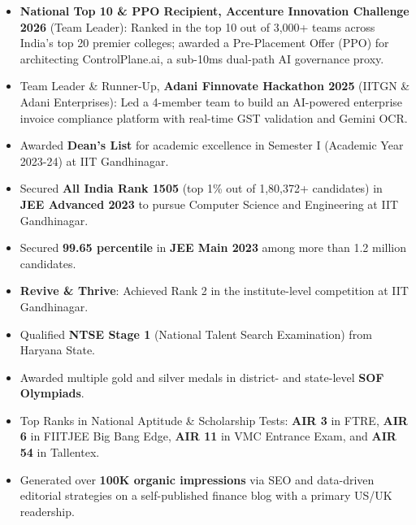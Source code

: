\documentclass[a4paper,10pt]{article}
\newcommand{\isep}{-2 pt}
\begin{document}
\begin{itemize} \itemsep \isep

    \item \textbf{National Top 10 \& PPO Recipient, Accenture Innovation Challenge 2026} (Team Leader): Ranked in the top 10 out of 3,000+ teams across India's top 20 premier colleges; awarded a Pre-Placement Offer (PPO) for architecting ControlPlane.ai, a sub-10ms dual-path AI governance proxy.

    \item Team Leader \& Runner-Up, \textbf{Adani Finnovate Hackathon 2025} (IITGN \& Adani Enterprises): Led a 4-member team to build an AI-powered enterprise invoice compliance platform with real-time GST validation and Gemini OCR.

    \item Awarded \textbf{Dean's List} for academic excellence in Semester I (Academic Year 2023-24) at IIT Gandhinagar.

    \item Secured \textbf{All India Rank 1505} (top 1\% out of 1,80,372+ candidates) in \textbf{JEE Advanced 2023} to pursue Computer Science and Engineering at IIT Gandhinagar.

    \item Secured \textbf{99.65 percentile} in \textbf{JEE Main 2023} among more than 1.2 million candidates.

    \item \textbf{Revive \& Thrive}: Achieved Rank 2 in the institute-level competition at IIT Gandhinagar.

    \item Qualified \textbf{NTSE Stage 1} (National Talent Search Examination) from Haryana State.

    \item Awarded multiple gold and silver medals in district- and state-level \textbf{SOF Olympiads}.

    \item Top Ranks in National Aptitude \& Scholarship Tests: \textbf{AIR 3} in FTRE, \textbf{AIR 6} in FIITJEE Big Bang Edge, \textbf{AIR 11} in VMC Entrance Exam, and \textbf{AIR 54} in Tallentex.

    \item Generated over \textbf{100K organic impressions} via SEO and data-driven editorial strategies on a self-published finance blog with a primary US/UK readership.

\end{itemize}
\end{document}

